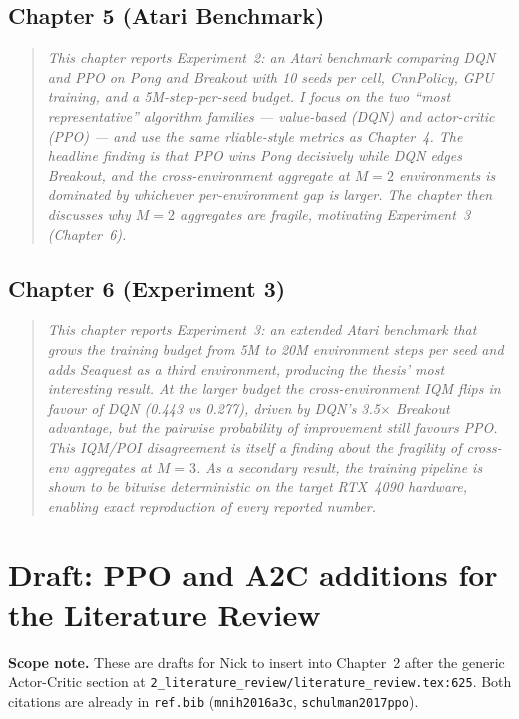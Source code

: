 \documentclass[11pt,a4paper]{article}
\newcommand{\fileline}[1]{\texttt{\small #1}}
\begin{document}
\subsection*{Chapter 5 (Atari Benchmark)}

\begin{quote}
\textit{This chapter reports Experiment~2: an Atari benchmark comparing
DQN and PPO on Pong and Breakout with 10 seeds per cell, CnnPolicy,
GPU training, and a 5M-step-per-seed budget. I focus on the two
``most representative'' algorithm families --- value-based (DQN) and
actor-critic (PPO) --- and use the same rliable-style metrics as
Chapter~4. The headline finding is that PPO wins Pong decisively while
DQN edges Breakout, and the cross-environment aggregate at $M=2$
environments is dominated by whichever per-environment gap is larger.
The chapter then discusses why $M=2$ aggregates are fragile, motivating
Experiment~3 (Chapter~6).}
\end{quote}

\subsection*{Chapter 6 (Experiment 3)}

\begin{quote}
\textit{This chapter reports Experiment~3: an extended Atari benchmark
that grows the training budget from 5M to 20M environment steps per
seed and adds Seaquest as a third environment, producing the thesis'
most interesting result. At the larger budget the cross-environment IQM
flips in favour of DQN (0.443 vs 0.277), driven by DQN's 3.5$\times$
Breakout advantage, but the pairwise probability of improvement still
favours PPO. This IQM/POI disagreement is itself a finding about the
fragility of cross-env aggregates at $M=3$. As a secondary result, the
training pipeline is shown to be bitwise deterministic on the target
RTX~4090 hardware, enabling exact reproduction of every reported number.}
\end{quote}

\section{Draft: PPO and A2C additions for the Literature Review}\label{sec:ppoa2c}

\textbf{Scope note.} These are drafts for Nick to insert into Chapter~2
after the generic Actor-Critic section at
\fileline{2\_literature\_review/literature\_review.tex:625}. Both
citations are already in \fileline{ref.bib}
(\fileline{mnih2016a3c}, \fileline{schulman2017ppo}).
\end{document}
